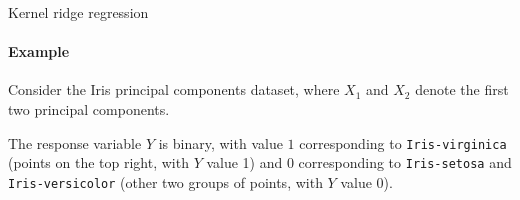 \begin{frame}{Kernel ridge regression}
\framesubtitle{Example}

Consider the Iris principal components dataset, where $X_1$ and $X_2$ denote
the first two principal components. 

\medskip

The response variable $Y$ is binary,
with value $1$ corresponding to {\tt Iris-virginica} (points on the
top right, with $Y$ value 1) and $0$
corresponding to {\tt Iris-setosa} and {\tt Iris-versicolor} (other
two groups of points, with $Y$ value $0$).

\vspace*{1cm}

\centerline{
    }%
\end{frame}
%
%
